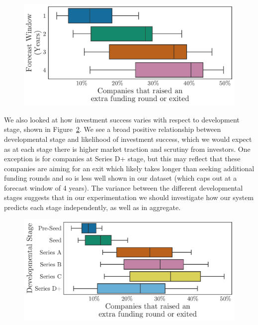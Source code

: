 \documentclass[../thesis/thesis.tex]{subfiles}
\begin{document}
\begin{figure}[!htb]
    \centering
    \includegraphics[width=\textwidth]{../figures/evaluation/outcome_forecast_window}
    \caption[Investment success by forecast window]{}
    \label{fig:evaluation:outcome_forecast_window}
\end{figure}

We also looked at how investment success varies with respect to development stage, shown in Figure~\ref{fig:evaluation:outcome_stage}. We see a broad positive relationship between developmental stage and likelihood of investment success, which we would expect as at each stage there is higher market traction and scrutiny from investors. One exception is for companies at Series D+ stage, but this may reflect that these companies are aiming for an exit which likely takes longer than seeking additional funding rounds and so is less well shown in our dataset (which caps out at a forecast window of 4 years). The variance between the different developmental stages suggests that in our experimentation we should investigate how our system predicts each stage independently, as well as in aggregate.

\begin{figure}[!htb]
    \centering
    \includegraphics[width=\textwidth]{../figures/evaluation/outcome_stage}
    \caption[Investment success by developmental stage]{}
    \label{fig:evaluation:outcome_stage}
\end{figure}
\end{document}
